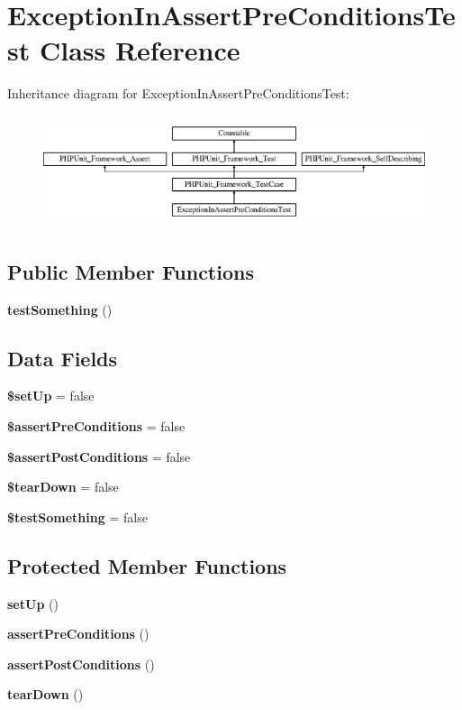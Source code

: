 \section{Exception\+In\+Assert\+Pre\+Conditions\+Test Class Reference}
\label{class_exception_in_assert_pre_conditions_test}
Inheritance diagram for Exception\+In\+Assert\+Pre\+Conditions\+Test\+:\begin{figure}[H]
\begin{center}
\leavevmode
\includegraphics[height=3.303835cm]{class_exception_in_assert_pre_conditions_test}
\end{center}
\end{figure}
\subsection*{Public Member Functions}
\begin{DoxyCompactItemize}
\item 
{\bf test\+Something} ()
\end{DoxyCompactItemize}
\subsection*{Data Fields}
\begin{DoxyCompactItemize}
\item 
{\bf \$set\+Up} = false
\item 
{\bf \$assert\+Pre\+Conditions} = false
\item 
{\bf \$assert\+Post\+Conditions} = false
\item 
{\bf \$tear\+Down} = false
\item 
{\bf \$test\+Something} = false
\end{DoxyCompactItemize}
\subsection*{Protected Member Functions}
\begin{DoxyCompactItemize}
\item 
{\bf set\+Up} ()
\item 
{\bf assert\+Pre\+Conditions} ()
\item 
{\bf assert\+Post\+Conditions} ()
\item 
{\bf tear\+Down} ()
\end{DoxyCompactItemize}
